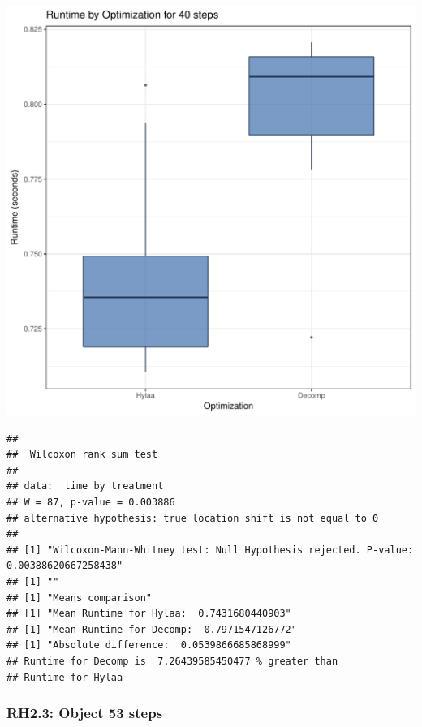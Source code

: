 \documentclass{article}\usepackage[]{graphicx}\usepackage[]{color}
\makeatletter
\def\maxwidth{ %
  \ifdim\Gin@nat@width>\linewidth
    \linewidth
  \else
    \Gin@nat@width
  \fi
}
\newenvironment{kframe}{%
 \def\at@end@of@kframe{}%
 \ifinner\ifhmode%
  \def\at@end@of@kframe{\end{minipage}}%
  \begin{minipage}{\columnwidth}%
 \fi\fi%
 \def\FrameCommand##1{\hskip\@totalleftmargin \hskip-\fboxsep
 \colorbox{shadecolor}{##1}\hskip-\fboxsep
     \hskip-\linewidth \hskip-\@totalleftmargin \hskip\columnwidth}%
 \MakeFramed {\advance\hsize-\width
   \@totalleftmargin\z@ \linewidth\hsize
   \@setminipage}}%
 {\par\unskip\endMakeFramed%
 \at@end@of@kframe}
\newenvironment{knitrout}{}{} %
\makeatother
\begin{document}
\begin{knitrout}
\color{fgcolor}
\includegraphics[width=\maxwidth]{figure/RH2_steps40-1} 
\begin{kframe}\begin{verbatim}
## 
## 	Wilcoxon rank sum test
## 
## data:  time by treatment
## W = 87, p-value = 0.003886
## alternative hypothesis: true location shift is not equal to 0
## 
## [1] "Wilcoxon-Mann-Whitney test: Null Hypothesis rejected. P-value: 0.00388620667258438"
## [1] ""
## [1] "Means comparison"
## [1] "Mean Runtime for Hylaa:  0.7431680440903"
## [1] "Mean Runtime for Decomp:  0.7971547126772"
## [1] "Absolute difference:  0.0539866685868999"
## Runtime for Decomp is  7.26439585450477 % greater than 
## Runtime for Hylaa
\end{verbatim}
\end{kframe}
\end{knitrout}


\subsubsection{RH2.3: Object 53 steps}
\end{document}
